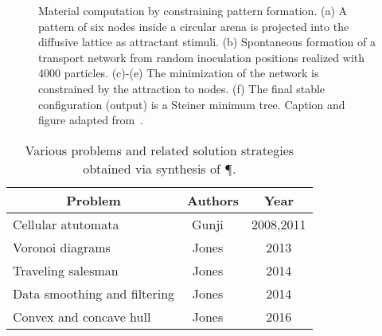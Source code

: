 			\begin{figure}
				\centering
				\newline
				
				
				\caption[Multi-agent \P \ - Evolution of agents]{Material computation by constraining pattern formation. (a) A pattern of six nodes inside a circular arena is projected into the diffusive lattice as attractant stimuli. (b) Spontaneous formation of a transport network from random inoculation positions realized with 4000 particles. (c)-(e) The minimization of the network is constrained by the attraction to nodes. (f) The final stable configuration (output) is a Steiner minimum tree. Caption and figure adapted from~\cite{jones2016multi}.}
				\label{fig:agent_mst}
			\end{figure}

			\begin{table}
				\centering
				\begin{tabular}{@{} l *2c @{}}
				\toprule
				 \multicolumn{1}{c}{Problem}    & Authors  & Year   \\ 
				\midrule
				 Cellular atutomata & Gunji \etal~\cite{gunji2008minimal,gunji2011adaptive}  & 2008,2011 \\ 
				 Voronoi diagrams & Jones \etal~\cite{jones2015slime} & 2013 \\ 
				 Traveling salesman & Jones \etal~\cite{jones2014computation} & 2014 \\ 
				 Data smoothing and filtering & Jones \etal~\cite{jones2014material} & 2014 \\ 
				 Convex and concave hull & Jones \etal~\cite{jones2016multi} & 2016 \\ 
				
				


				\bottomrule
				\end{tabular}
				\caption[Computing by synthesis of \P]{Various problems and related solution strategies obtained via synthesis of \P.}
				\label{tab:list_synthesize}
			\end{table}

